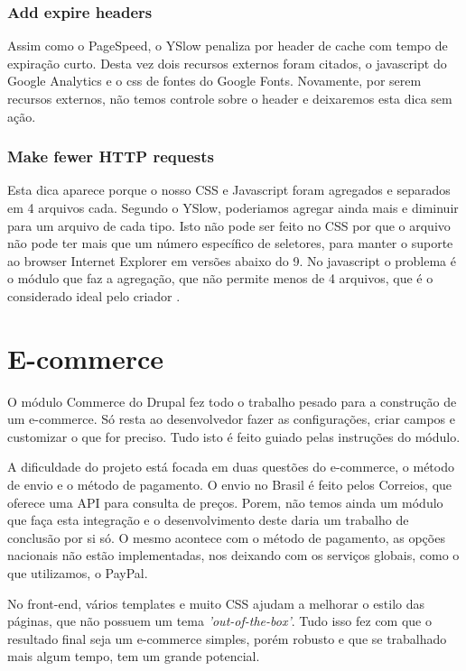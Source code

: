 \subsubsection{Add expire headers}
Assim como o PageSpeed, o YSlow penaliza por header de cache com tempo de expiração curto. Desta vez dois recursos externos foram citados, o javascript do Google Analytics e o css de fontes do Google Fonts. Novamente, por serem recursos externos, não temos controle sobre o header e deixaremos esta dica sem ação.

\subsubsection{Make fewer HTTP requests}
Esta dica aparece porque o nosso CSS e Javascript foram agregados e separados em 4 arquivos cada. Segundo o YSlow, poderiamos agregar ainda mais e diminuir para um arquivo de cada tipo. Isto não pode ser feito no CSS por que o arquivo não pode ter mais que um número específico de seletores, para manter o suporte ao browser Internet Explorer em versões abaixo do 9. No javascript o problema é o módulo que faz a agregação, que não permite menos de 4 arquivos, que é o considerado ideal pelo criador \cite{AdvAgg}.

\section{E-commerce}
O módulo Commerce do Drupal fez todo o trabalho pesado para a construção de um e-commerce. Só resta ao desenvolvedor fazer as configurações, criar campos e customizar o que for preciso. Tudo isto é feito guiado pelas instruções do módulo.

A dificuldade do projeto está focada em duas questões do e-commerce, o método de envio e o método de pagamento. O envio no Brasil é feito pelos Correios, que oferece uma API para consulta de preços. Porem, não temos ainda um módulo que faça esta integração e o desenvolvimento deste daria um trabalho de conclusão por si só. O mesmo acontece com o método de pagamento, as opções nacionais não estão implementadas, nos deixando com os serviços globais, como o que utilizamos, o PayPal.

No front-end, vários templates e muito CSS ajudam a melhorar o estilo das páginas, que não possuem um tema \textit{'out-of-the-box'}. Tudo isso fez com que o resultado final seja um e-commerce simples, porém robusto e que se trabalhado mais algum tempo, tem um grande potencial.

